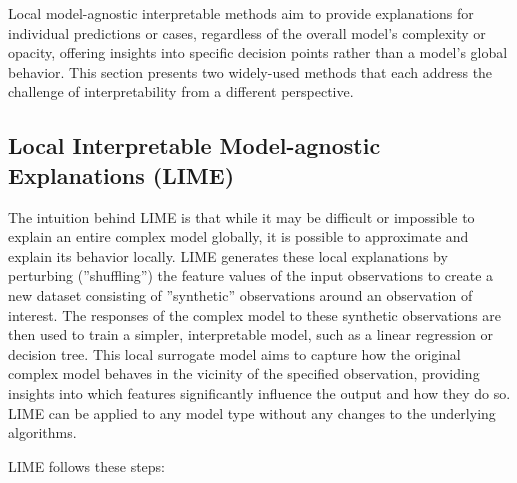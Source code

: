 Local model-agnostic interpretable methods aim to provide explanations for individual predictions or cases, regardless of the overall model's complexity or opacity, offering insights into specific decision points rather than a model's global behavior. This section presents two widely-used methods that each address the challenge of interpretability from a different perspective.

\subsection{Local Interpretable Model-agnostic Explanations (LIME)}

The intuition behind LIME is that while it may be difficult or impossible to explain an entire complex model globally, it is possible to approximate and explain its behavior locally. LIME generates these local explanations by perturbing (''shuffling'') the feature values of the input observations to create a new dataset consisting of ''synthetic'' observations around an observation of interest. The responses of the complex model to these synthetic observations are then used to train a simpler, interpretable model, such as a linear regression or decision tree. This local surrogate model aims to capture how the original complex model behaves in the vicinity of the specified observation, providing insights into which features significantly influence the output and how they do so. LIME can be applied to any model type without any changes to the underlying algorithms. 

LIME follows these steps:

